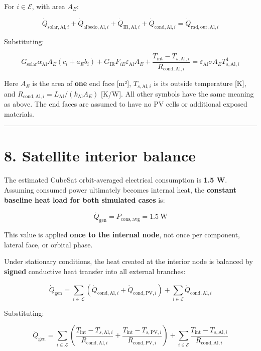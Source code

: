 \documentclass[
]{book}
\begin{document}
For \(i\in\mathcal E\), with area \(A_E\):

\[
\boxed{
\dot Q_{\mathrm{solar,Al},i}
+\dot Q_{\mathrm{albedo,Al},i}
+\dot Q_{\mathrm{IR,Al},i}
+\dot Q_{\mathrm{cond,Al},i}
=\dot Q_{\mathrm{rad,out,Al},i}
}
\]

Substituting:

\[
G_{\mathrm{solar}}\alpha_{\mathrm{Al}}A_E(c_i+a_Eb_i)
+
G_{\mathrm{IR}}F_{iE}\varepsilon_{\mathrm{Al}}A_E
+
\frac{T_{\mathrm{int}}-T_{s,\mathrm{Al},i}}{R_{\mathrm{cond,Al},i}}
=
\varepsilon_{\mathrm{Al}}\sigma A_E T_{s,\mathrm{Al},i}^{4}
\]

Here \(A_E\) is the area of \textbf{one} end face {[}m²{]}, \(T_{s,\mathrm{Al},i}\) is its outside temperature {[}K{]}, and \(R_{\mathrm{cond,Al},i}=L_{\mathrm{Al}}/(k_{\mathrm{Al}}A_E)\) {[}K/W{]}. All other symbols have the same meaning as above. The end faces are assumed to have no PV cells or additional exposed materials.

\begin{center}\rule{0.5\linewidth}{0.5pt}\end{center}

\section{8. Satellite interior balance}\label{satellite-interior-balance}

The estimated CubeSat orbit-averaged electrical consumption is \textbf{1.5 W}. Assuming consumed power ultimately becomes internal heat, the \textbf{constant baseline heat load for both simulated cases} is:

\[
\boxed{\dot Q_{\mathrm{gen}}=P_{\mathrm{cons,avg}}=1.5\ \mathrm{W}}
\]

This value is applied \textbf{once to the internal node}, not once per component, lateral face, or orbital phase.

Under stationary conditions, the heat created at the interior node is balanced by \textbf{signed} conductive heat transfer into all external branches:

\[
\dot Q_{\mathrm{gen}}
=\sum_{i\in\mathcal L}\left(
\dot Q_{\mathrm{cond,Al},i}
+\dot Q_{\mathrm{cond,PV},i}
\right)
+\sum_{i\in\mathcal E}\dot Q_{\mathrm{cond,Al},i}
\]

Substituting:

\[
\dot Q_{\mathrm{gen}}
=
\sum_{i\in\mathcal{L}}
\left(
\frac{T_{\mathrm{int}}-T_{s,\mathrm{Al},i}}{R_{\mathrm{cond,Al},i}}
+
\frac{T_{\mathrm{int}}-T_{s,\mathrm{PV},i}}{R_{\mathrm{cond,PV},i}}
\right)
+
\sum_{i\in\mathcal{E}}
\frac{T_{\mathrm{int}}-T_{s,\mathrm{Al},i}}{R_{\mathrm{cond,Al},i}}
\]
\end{document}
